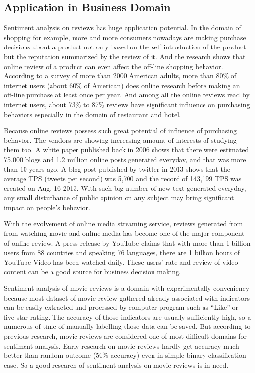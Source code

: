 \documentclass[conference]{IEEEtran}
\begin{document}
\subsection{Application in Business Domain}
    Sentiment analysis on reviews has huge application potential. In the domain of 
    shopping for example, more and more consumers nowadays are making 
    purchase decisions about a product not only based on the self introduction of the 
    product but the reputation summarized by the review of it. And the research
    shows that online review of a product can even affect the off-line shopping
    behavior\cite{lipsman2007online}. According to a survey of more than 2000 
    American adults, more than 80\% of internet users (about 60\% of American) 
    does online research before making an off-line purchase at least once per year.
    And among all the online reviews read by internet users, about 73\% to 87\% reviews
    have significant influence on purchasing behaviors especially in the domain
    of restaurant and hotel\cite{pang2008opinion}.
    
    Because online reviews possess such great potential of influence of purchasing
    behavior. The vendors are showing increasing amount of interests of studying them
    too. A white paper published back in 2006\cite{kim2006forrester} shows that 
    there were estimated 75,000 blogs and 1.2 million online posts generated 
    everyday, and that was more than 10 years ago. A blog post published by twitter
    in 2013 shows that the average TPS (tweets per second) was 5,700 and the record
    of 143,199 TPS was created on Aug. 16 2013\cite{tps2013}. With such big number of
    new text generated everyday, any small disturbance of public opinion on any subject
    may bring significant impact on people's behavior.
    
    With the evolvement of online media streaming service, reviews generated from
    from watching movie and online media has become one of the major component of 
    online review. A press release by YouTube claims that with more than 1 billion
    users from 88 countries and speaking 76 languages, there are 1 billion
    hours of YouTube Video has been watched daily. These users' rate and review of 
    video content can be a good source for business decision making. 
    
    Sentiment analysis of movie reviews is a domain with experimentally conveniency
    because most dataset of movie review gathered already associated with indicators 
    can be easily extracted and processed by computer program such as
    ``Like'' or five-star-rating. The accuracy of those indicators are usually sufficiently
    high, so a numerous of time of manually labelling those data can be saved. But
    according to previous research\cite{turney2002unsupervised}, movie reviews are
    considered one of most difficult domains for sentiment analysis. Early research
    on movie reviews hardly get accuracy much better than random outcome 
    (50\% accuracy) even in simple binary classification case\cite{pang2002thumbs}.
    So a good research of sentiment analysis on movie reviews is in need.
    
\end{document}
